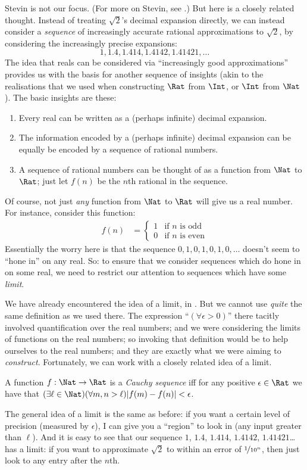 \documentclass[../../../include/open-logic-section]{subfiles}
\begin{document}
Stevin is not our focus. (For more on Stevin, see \citealt{KatzKatz2012}.) But here is a closely related thought. Instead of treating $\sqrt{2}$'s decimal expansion directly, we can instead consider a  \emph{sequence} of increasingly accurate rational approximations to $\sqrt{2}$, by considering the increasingly precise expansions: 
	$$1, 1.4, 1.414, 1.4142, 1.41421,\ldots$$
The idea that reals can be considered via ``increasingly good approximations'' provides us with the basis for another sequence of insights (akin to the realisations that we used when constructing $\Rat$ from $\Int$, or $\Int$ from $\Nat$). The basic insights are these:
	\begin{enumerate}
		\item Every real can be written as a (perhaps infinite) decimal expansion.
		\item The information encoded by a (perhaps infinite) decimal expansion can be equally be encoded by a sequence of rational numbers.
		\item A sequence of rational numbers can be thought of as a function from $\Nat$ to $\Rat$; just let $f(n)$ be the $n$th rational in the sequence.
	\end{enumerate}
Of course, not just \emph{any} function from $\Nat$ to $\Rat$ will give us a real number. For instance, consider this function:
	\begin{align*}
		f(n) &=\begin{cases}
			1 & \text{if }n\text{ is odd}\\
			0 &\text{if }n\text{ is even}
		\end{cases}
	\end{align*}
Essentially the worry here is that the sequence $0,1,0,1,0,1,0,\ldots$ doesn't seem to ``hone in'' on any real. So: to ensure that we consider sequences which do hone in on some real, we need to restrict our attention to sequences which have some \emph{limit}. 

We have already encountered the idea of a limit, in . But we cannot use \emph{quite} the same definition as we used there. The expression ``$(\forall \epsilon>0)$'' there tacitly involved quantification over the real numbers; and we were considering the limits of functions on the real numbers; so invoking that definition would be to help ourselves to the real numbers; and they are exactly what we were aiming to \emph{construct}. Fortunately, we can work with a closely related idea of a limit. 
	\begin{defn}\label{def:CauchySequence}
		A function $f: \Nat \to \Rat$ is a \emph{Cauchy sequence} iff for any positive $\epsilon \in \Rat$ we have that $(\exists \ell \in \Nat)(\forall m, n > \ell)|f(m) - f(n)| < \epsilon$. 
	\end{defn}\noindent	
The general idea of a limit is the same as before: if you want a certain level of precision (measured by $\epsilon$), I can give you a ``region'' to look in (any input greater than $\ell$). And it is easy to see that our sequence $1$, $1.4$, $1.414$, $1.4142$, $1.41421$\ldots has a limit: if you want to approximate $\sqrt{2}$ to within an error of $\nicefrac{1}{10^{n}}$, then just look to any entry after the $n$th.
\end{document}
